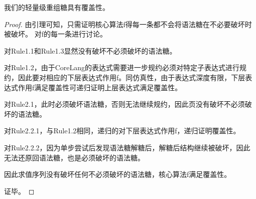 \begin{mythm}[覆盖性]
	我们的轻量级重组糖具有覆盖性。
\end{mythm}

\begin{proof}
	由引理可知，只需证明核心算法f得每一条都不会将语法糖在不必要破坏时被破坏。
	对f的每一条进行讨论。
	
	对Rule1.1和Rule1.3显然没有破坏不必须破坏的语法糖。
	
	对Rule1.2，由于CoreLang的表达式需要进一步规约必须对特定子表达式进行规约，因此要对相应的下层表达式作用f。同仿真性，由于表达式深度有限，下层表达式作用f满足覆盖性可递归证明上层表达式满足覆盖性。
	
	对Rule2.1，此时必须破坏语法糖，否则无法继续规约，因此页没有破坏不必须破坏的语法糖。
	
	对Rule2.2.1，与Rule1.2相同，递归的对下层表达式作用f，递归证明覆盖性。
	
	对Rule2.2.2，因为单步尝试后发现语法糖解糖后，解糖后结构继续被破坏，因此无法还原回语法糖，也是必须破坏的语法糖。
	
	因此求值序列没有破坏任何不必须破坏的语法糖，核心算法f满足覆盖性。
	
	证毕。
\end{proof}



